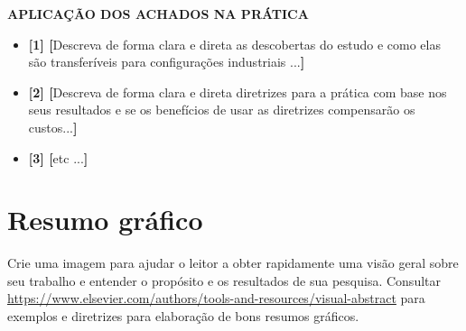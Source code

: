 \documentclass{ppgi-resumo}
\begin{document}
        \noindent\textbf{\Large{APLICAÇÃO DOS ACHADOS NA PRÁTICA}}
        \begin{itemize}[leftmargin=*]
	\setlength\itemsep{-0.3em}
	\item \textbf{[1] [}\textcolor{colorUTFPR}{Descreva de forma clara e direta as descobertas do estudo e como elas são transferíveis para configurações industriais ...}\textbf{]}
	\item \textbf{[2] [}\textcolor{colorUTFPR}{Descreva de forma clara e direta diretrizes para a prática com base nos seus resultados e se os benefícios de usar as diretrizes compensarão os custos...}\textbf{]}
	\item \textbf{[3] [}\textcolor{colorUTFPR}{etc ...}\textbf{]}
\end{itemize}
    \endminipage\hfill  


\section*{Resumo gráfico}

\textcolor{colorUTFPR}{Crie uma imagem para ajudar o leitor a obter rapidamente uma visão geral sobre seu trabalho e entender o propósito e os resultados de sua pesquisa. Consultar \url{https://www.elsevier.com/authors/tools-and-resources/visual-abstract} para exemplos e diretrizes para elaboração de bons resumos gráficos.}
\end{document}
